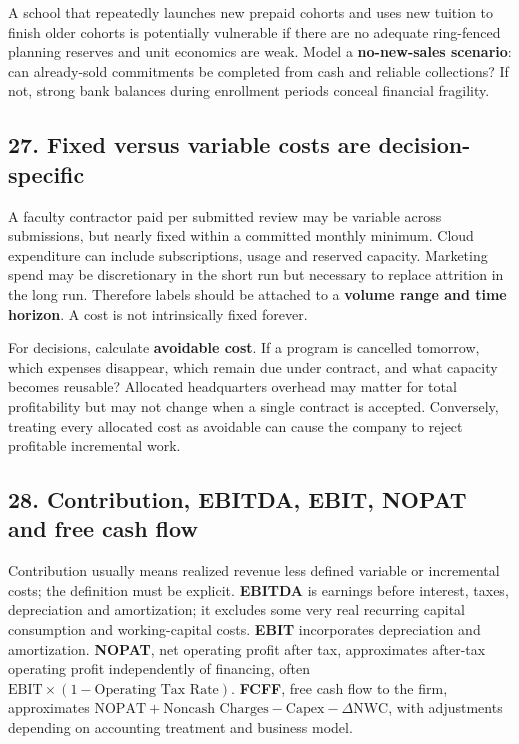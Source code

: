 A school that repeatedly launches new prepaid cohorts and uses new tuition to finish older cohorts is potentially vulnerable if there are no adequate ring-fenced planning reserves and unit economics are weak. Model a \textbf{no-new-sales scenario}: can already-sold commitments be completed from cash and reliable collections? If not, strong bank balances during enrollment periods conceal financial fragility.

\subsection{27. Fixed versus variable costs are decision-specific}


A faculty contractor paid per submitted review may be variable across submissions, but nearly fixed within a committed monthly minimum. Cloud expenditure can include subscriptions, usage and reserved capacity. Marketing spend may be discretionary in the short run but necessary to replace attrition in the long run. Therefore labels should be attached to a \textbf{volume range and time horizon}. A cost is not intrinsically fixed forever.

For decisions, calculate \textbf{avoidable cost}. If a program is cancelled tomorrow, which expenses disappear, which remain due under contract, and what capacity becomes reusable? Allocated headquarters overhead may matter for total profitability but may not change when a single contract is accepted. Conversely, treating every allocated cost as avoidable can cause the company to reject profitable incremental work.

\subsection{28. Contribution, EBITDA, EBIT, NOPAT and free cash flow}


Contribution usually means realized revenue less defined variable or incremental costs; the definition must be explicit. \textbf{EBITDA} is earnings before interest, taxes, depreciation and amortization; it excludes some very real recurring capital consumption and working-capital costs. \textbf{EBIT} incorporates depreciation and amortization. \textbf{NOPAT}, net operating profit after tax, approximates after-tax operating profit independently of financing, often $\mathrm{EBIT} \times (1 - \text{Operating Tax Rate})$. \textbf{FCFF}, free cash flow to the firm, approximates $\mathrm{NOPAT} + \text{Noncash Charges} - \mathrm{Capex} - \Delta \mathrm{NWC}$, with adjustments depending on accounting treatment and business model.

